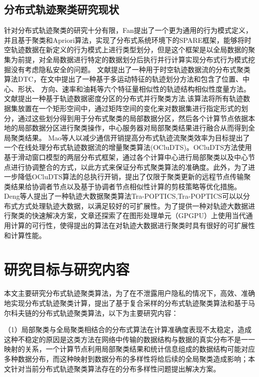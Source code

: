 \subsection{分布式轨迹聚类研究现状}
针对分布式轨迹聚类的研究十分有限，Fan提出了一个更为通用的行为模式定义，并且基于聚类和Apriori算法，实现了分布式系统环境下的SPARE框架，能够将时空轨迹数据在新定义的行为模式上进行类型划分，但是这个框架是以全局数据的聚集为前提，对全局数据进行特定的数据划分后执行并行计算实现分布式行为模式挖掘没有考虑隐私安全的问题。
文献\cite{肖源分布式车辆时空轨迹异常检测算法研究}提出了一种用于时空轨迹数据流的分布式聚类算法DTC，在文中提出了一种基于多运动特征的轨迹划分方法和包含了位置、中心、形状、
方向、速率和油耗等六个特征量相似性的轨迹结构相似性度量方法。
文献\cite{Wang2018A}提出一种基于轨迹数据密度分区的分布式并行聚类方法,该算法将所有轨迹数据集放置在一个矩形空间中，通过矩阵空间的变化来对数据集进行指定形式的划分，通过这些划分得到用于分布式聚类的局部数据分区，然后各个计算节点依据本地的局部数据分区进行聚类操作，中心服务器对局部聚类结果进行融合从而得到全局聚类结果。
Mao等人以减少通信开销提高分布式轨迹流聚类效率为目标提出了一个在线处理分布式轨迹数据流的增量聚类算法(OCluDTS)。OCluDTS方法使用基于滑动窗口模型的两层分布式框架，通过各个计算中心进行局部聚类以及中心节点进行协调整合的方式，以此方式来保证分布式聚类算法的准确度。此外，为了进一步降低OCluDTS算法的总执行开销，提出了仅限于聚类更新的远程节点传输聚类结果给协调者节点以及基于协调者节点相似性计算的剪枝策略等优化措施。
Deng等人提出了一种轨迹大数据聚类算法Tra-POPTICS,Tra-POPTICS可以以分布式方式处理轨迹大数据，以满足较好的可扩展性。为了提供一种对轨迹大数据进行聚类的快速解决方案，文章还探索了在图形处理单元（GPGPU）上使用当代通用计算的可行性，使得提出的算法在对轨迹大数据进行聚类时具有很好的可扩展性和计算性能。


\section{研究目标与研究内容}

本文主要研究分布式轨迹聚类算法，为了在不泄露用户隐私的情况下，高效、准确地实现分布式轨迹聚类计算，提出了基于复合采样的分布式轨迹聚类算法和基于马尔科夫链的分布式轨迹聚类算法，以下为主要研究内容：

（1）局部聚类与全局聚类相结合的分布式算法在计算准确度表现不太稳定，造成这种不稳定的原因是这类方法在网络中传输的数据结构与数据的真实分布不是一一映射的关系，一个计算节点利用局部聚类结果和统计信息组成的数据结构可能对应多种数据分布，而这种映射到数据分布的多样性将给后续的全局聚类造成影响；本文针对当前分布式轨迹聚类算法存在的分布多样性问题提出解决方案。

